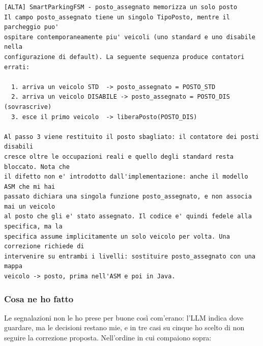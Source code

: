 \begin{lstlisting}[style=llm]
[ALTA] SmartParkingFSM - posto_assegnato memorizza un solo posto
Il campo posto_assegnato tiene un singolo TipoPosto, mentre il parcheggio puo'
ospitare contemporaneamente piu' veicoli (uno standard e uno disabile nella
configurazione di default). La seguente sequenza produce contatori errati:

  1. arriva un veicolo STD  -> posto_assegnato = POSTO_STD
  2. arriva un veicolo DISABILE -> posto_assegnato = POSTO_DIS (sovrascrive)
  3. esce il primo veicolo  -> liberaPosto(POSTO_DIS)

Al passo 3 viene restituito il posto sbagliato: il contatore dei posti disabili
cresce oltre le occupazioni reali e quello degli standard resta bloccato. Nota che
il difetto non e' introdotto dall'implementazione: anche il modello ASM che mi hai
passato dichiara una singola funzione posto_assegnato, e non associa mai un veicolo
al posto che gli e' stato assegnato. Il codice e' quindi fedele alla specifica, ma la
specifica assume implicitamente un solo veicolo per volta. Una correzione richiede di
intervenire su entrambi i livelli: sostituire posto_assegnato con una mappa
veicolo -> posto, prima nell'ASM e poi in Java.
\end{lstlisting}

\subsubsection*{Cosa ne ho fatto}

Le segnalazioni non le ho prese per buone così com'erano: l'LLM indica dove guardare,
ma le decisioni restano mie, e in tre casi su cinque ho scelto di non seguire la
correzione proposta. Nell'ordine in cui compaiono sopra:

